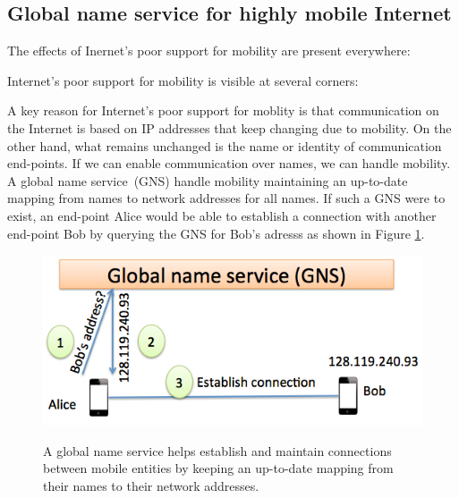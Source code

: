\subsection{Global name service for highly mobile Internet}

The effects of Inernet's poor support for mobility are present everywhere:

Internet's poor support for mobility is visible at several corners: 

A key reason for Internet's poor support for moblity is that communication on the Internet is based on IP addresses that keep changing due to mobility. On the other hand, what remains unchanged is the name or identity of communication end-points. If we can enable communication over names, we can handle mobility. A  global name service (GNS) handle mobility maintaining an up-to-date mapping from names to network addresses for all names. If such a GNS were to exist, an end-point Alice would be able to establish a connection with another end-point Bob by querying the GNS for Bob's adresss as shown in Figure \ref{fig:gns-example}. 

\begin{figure}
	\centering
	\includegraphics[scale=0.4]{fig/gns-example.png}
	\label{fig:gns-example}
	\caption{A global name service helps establish and maintain connections between mobile entities by keeping an up-to-date mapping from their names to their network addresses.}
\end{figure}

